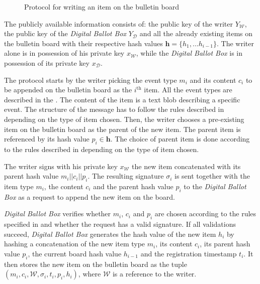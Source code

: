 \begin{figure}[ht]
    \caption{Protocol for writing an item on the bulletin board}
    \label{fig: protocol for writing an item on the bulletin board}
\end{figure}

The publicly available information consists of: the public key of the writer $Y_\mathcal{W}$, the public key of the \textit{Digital Ballot Box} $Y_\mathcal{D}$ and all the already existing items on the bulletin board with their respective hash values $\boldsymbol{h} = \{h_1, ... h_{i-1}\}$. The writer alone is in possession of his private key $x_\mathcal{W}$, while the \textit{Digital Ballot Box} is in possession of its private key $x_\mathcal{D}$.

The protocol starts by the writer picking the event type $m_i$ and its content $c_i$ to be appended on the bulletin board as the $i^\mathrm{th}$ item. All the event types are described in the . The content of the item is a text blob describing a specific event. The structure of the message has to follow the rules described in  depending on the type of item chosen. Then, the writer chooses a pre-existing item on the bulletin board as the parent of the new item. The parent item is referenced by its hash value $p_i \in \boldsymbol{h}$. The choice of parent item is done according to the rules described in  depending on the type of item chosen.

The writer signs with his private key $x_\mathcal{W}$ the new item concatenated with its parent hash value $m_i || c_i || p_i$. The resulting signature $\sigma_i$ is sent together with the item type $m_i$, the content $c_i$ and the parent hash value $p_i$ to the \textit{Digital Ballot Box} as a request to append the new item on the board.

\textit{Digital Ballot Box} verifies whether $m_i$, $c_i$ and $p_i$ are chosen according to the rules specified in  and whether the request has a valid signature. If all validations succeed, \textit{Digital Ballot Box} generates the hash value of the new item $h_i$ by hashing a concatenation of the new item type $m_i$, its content $c_i$, its parent hash value $p_i$, the current board hash value $h_{i-1}$ and the registration timestamp $t_i$. It then stores the new item on the bulletin board as the tuple $(m_i, c_i, \mathcal{W}, \sigma_i, t_i, p_i, h_i)$, where $\mathcal{W}$ is a reference to the writer.

